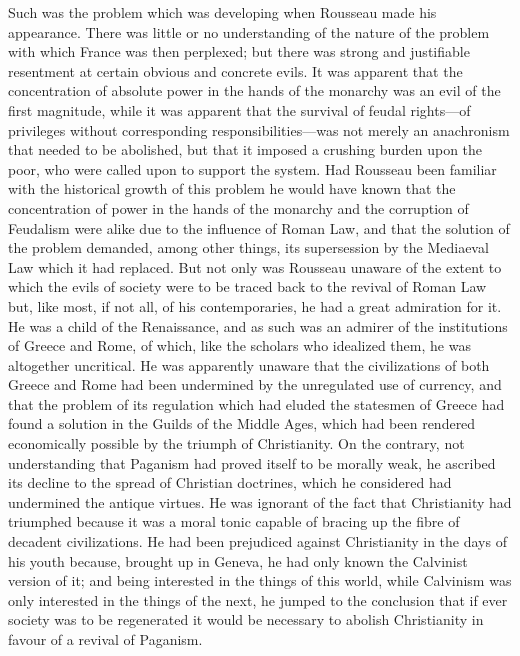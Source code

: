 \documentclass{book}
\begin{document}
Such was the problem which was developing when Rousseau made his appearance. There was little or no understanding of the nature of the problem with which France was then perplexed; but there was strong and justifiable resentment at certain obvious and concrete evils. It was apparent that the concentration of absolute power in the hands of the monarchy was an evil of the first magnitude, while it was apparent that the survival of feudal rights—of privileges without corresponding responsibilities—was not merely an anachronism that needed to be abolished, but that it imposed a crushing burden upon the poor, who were called upon to support the system. Had Rousseau been familiar with the historical growth of this problem he would have known that the concentration of power in the hands of the monarchy and the corruption of Feudalism were alike due to the influence of Roman Law, and that the solution of the problem demanded, among other things, its supersession by the Mediaeval Law which it had replaced. But not only was Rousseau unaware of the extent to which the evils of society were to be traced back to the revival of Roman Law but, like most, if not all, of his contemporaries, he had a great admiration for it. He was a child of the Renaissance, and as such was an admirer of the institutions of Greece and Rome, of which, like the scholars who idealized them, he was altogether uncritical. He was apparently unaware that the civilizations of both Greece and Rome had been undermined by the unregulated use of currency, and that the problem of its regulation which had eluded the statesmen of Greece had found a solution in the Guilds of the Middle Ages, which had been rendered economically possible by the triumph of Christianity. On the contrary, not understanding that Paganism had proved itself to be morally weak, he ascribed its decline to the spread of Christian doctrines, which he considered had undermined the antique virtues. He was ignorant of the fact that Christianity had triumphed because it was a moral tonic capable of bracing up the fibre of decadent civilizations. He had been prejudiced against Christianity in the days of his youth because, brought up in Geneva, he had only known the Calvinist version of it; and being interested in the things of this world, while Calvinism was only interested in the things of the next, he jumped to the conclusion that if ever society was to be regenerated it would be necessary to abolish Christianity in favour of a revival of Paganism.
\end{document}
